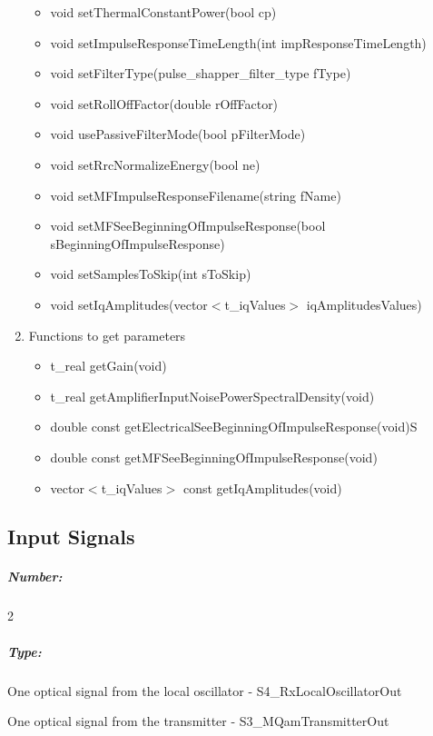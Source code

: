 \begin{enumerate}
\begin{itemize}
                \item void setThermalConstantPower(bool cp)
                \item void setImpulseResponseTimeLength(int impResponseTimeLength)
                \item void setFilterType(pulse\_shapper\_filter\_type fType)
                \item void setRollOffFactor(double rOffFactor)
                \item void usePassiveFilterMode(bool pFilterMode)
                \item void setRrcNormalizeEnergy(bool ne)
                \item void setMFImpulseResponseFilename(string fName)
                \item void setMFSeeBeginningOfImpulseResponse\newline(bool sBeginningOfImpulseResponse)
                \item void setSamplesToSkip(int sToSkip)
                \item void setIqAmplitudes(vector$<$t\_iqValues$>$ iqAmplitudesValues)
             \end{itemize}
         \item Functions to get parameters
             \begin{itemize}
                \item t\_real getGain(void)
                \item t\_real getAmplifierInputNoisePowerSpectralDensity(void)
                \item double const getElectricalSeeBeginningOfImpulseResponse(void)S
                \item double const getMFSeeBeginningOfImpulseResponse(void)
                \item vector$<$t\_iqValues$>$ const getIqAmplitudes(void)
             \end{itemize}
     \end{enumerate}

\subsection*{Input Signals}

\subparagraph*{Number:} 2

\subparagraph*{Type:} One optical signal from the local oscillator - S4\_RxLocalOscillatorOut \par One optical signal from the transmitter - S3\_MQamTransmitterOut

